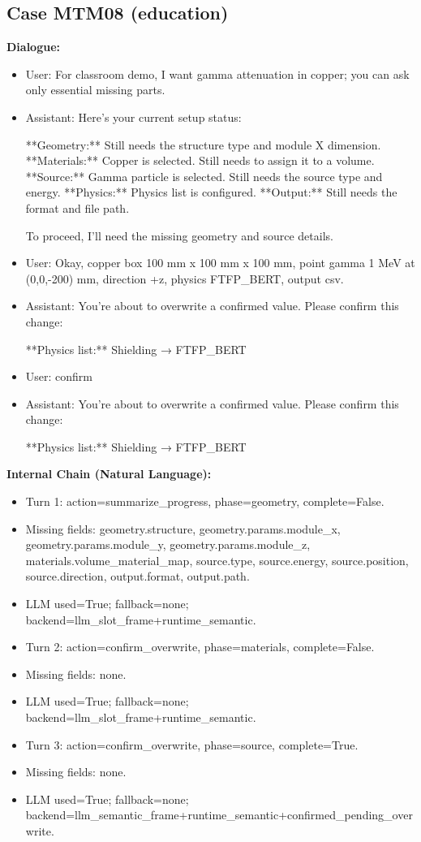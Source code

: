 \documentclass[11pt]{ctexart}
\begin{document}
\subsection{Case MTM08 (education)}
\textbf{Dialogue:}
\begin{itemize}
\item User: For classroom demo, I want gamma attenuation in copper; you can ask only essential missing parts.
\item Assistant: Here's your current setup status:

**Geometry:** Still needs the structure type and module X dimension.
**Materials:** Copper is selected. Still needs to assign it to a volume.
**Source:** Gamma particle is selected. Still needs the source type and energy.
**Physics:** Physics list is configured.
**Output:** Still needs the format and file path.

To proceed, I'll need the missing geometry and source details.
\item User: Okay, copper box 100 mm x 100 mm x 100 mm, point gamma 1 MeV at (0,0,-200) mm, direction +z, physics FTFP\_BERT, output csv.
\item Assistant: You're about to overwrite a confirmed value. Please confirm this change:

**Physics list:** Shielding → FTFP\_BERT
\item User: confirm
\item Assistant: You're about to overwrite a confirmed value. Please confirm this change:

**Physics list:** Shielding → FTFP\_BERT
\end{itemize}
\textbf{Internal Chain (Natural Language):}
\begin{itemize}
\item Turn 1: action=summarize\_progress, phase=geometry, complete=False.
\item Missing fields: geometry.structure, geometry.params.module\_x, geometry.params.module\_y, geometry.params.module\_z, materials.volume\_material\_map, source.type, source.energy, source.position, source.direction, output.format, output.path.
\item LLM used=True; fallback=none; backend=llm\_slot\_frame+runtime\_semantic.
\item Turn 2: action=confirm\_overwrite, phase=materials, complete=False.
\item Missing fields: none.
\item LLM used=True; fallback=none; backend=llm\_slot\_frame+runtime\_semantic.
\item Turn 3: action=confirm\_overwrite, phase=source, complete=True.
\item Missing fields: none.
\item LLM used=True; fallback=none; backend=llm\_semantic\_frame+runtime\_semantic+confirmed\_pending\_overwrite.
\end{itemize}
\end{document}
